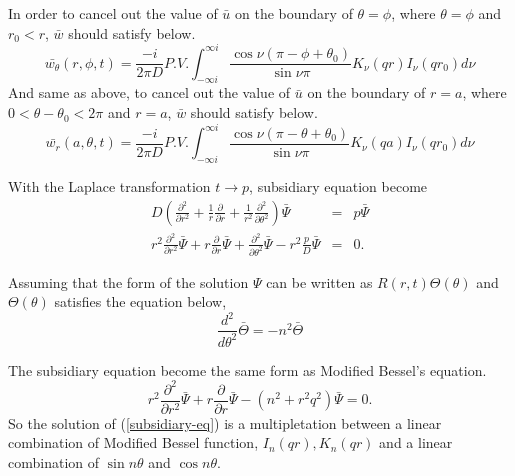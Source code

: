 \documentclass{article}
\begin{document}
In order to cancel out the value of $\bar{u}$ on the boundary of $\theta = \phi$,
 where $\theta = \phi$ and $r_0 < r$, $\bar{w}$ should satisfy below.
\begin{equation}
    \bar{w_\theta}(r, \phi, t) =
              \frac{-i}{2\pi D}P.V.\int^{\infty i}_{-\infty i}
              \frac{\cos\nu (\pi - \phi + \theta_0)}{\sin\nu\pi}
              K_\nu(qr)I_\nu(qr_0)d\nu
\end{equation}
And same as above, to cancel out the value of $\bar{u}$ on the boundary of $r = a$,
 where $0 < \theta-\theta_0 < 2\pi$ and $r=a$, $\bar{w}$ should satisfy below.
\begin{equation}
    \bar{w_r}(a, \theta, t) =
              \frac{-i}{2\pi D}P.V.\int^{\infty i}_{-\infty i}
              \frac{\cos\nu (\pi - \theta + \theta_0)}{\sin\nu\pi}
              K_\nu(qa)I_\nu(qr_0)d\nu
\end{equation}

With the Laplace transformation $t\rightarrow p$, subsidiary equation become
\begin{eqnarray}
    D\left( \frac{\partial^2}{\partial r^2} +
            \frac{1}{r}\frac{\partial}{\partial r} +
            \frac{1}{r^2}\frac{\partial^2}{\partial \theta^2}
            \right)
    \bar{\Psi}
    &=&
    p\bar{\Psi} \nonumber \\
    r^2 \frac{\partial^2}{\partial r^2}\bar{\Psi} +
    r   \frac{\partial}{\partial r}\bar{\Psi} +
        \frac{\partial^2}{\partial \theta^2}\bar{\Psi} -
    r^2 \frac{p}{D}\bar{\Psi} &=& 0.
\end{eqnarray}

Assuming that the form of the solution $\Psi$ can be written as
 $R(r, t)\Theta(\theta)$ and $\Theta(\theta)$ satisfies the equation below, 
\begin{equation}
    \frac{d^2}{d\theta^2}\bar{\Theta} = -n^2\bar{\Theta}
\end{equation}

The subsidiary equation become the same form as Modified Bessel's equation.
\begin{equation} \label{subsidiary-eq}
    r^2\frac{\partial^2}{\partial r^2}\bar{\Psi} +
    r\frac{\partial}{\partial r}\bar{\Psi} -(n^2 + r^2q^2)\bar{\Psi} = 0.
\end{equation}
So the solution of (\ref{subsidiary-eq}) is a multipletation between
 a linear combination of Modified Bessel function, $I_n(qr), K_n(qr)$ and
 a linear combination of $\sin n\theta$ and $\cos n\theta$.
\end{document}
